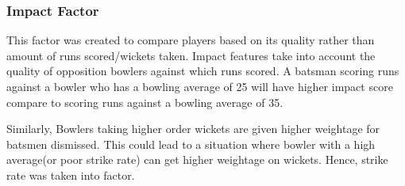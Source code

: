 \documentclass[a4paper]{article}
\begin{document}
\subsubsection{
Impact Factor
}

This factor was created to compare players based on its quality rather than amount of runs scored/wickets taken.
Impact features take into account the quality of opposition bowlers against which runs scored. A batsman scoring runs against a bowler who has a bowling average of 25 will have higher impact score compare to scoring runs against a bowling average of 35.


Similarly, Bowlers taking higher order wickets are given higher weightage for batsmen dismissed.  This could lead to a situation where bowler with a high average(or poor strike rate) can get higher weightage on wickets. Hence,  strike rate was taken into factor.
\newline
\end{document}
